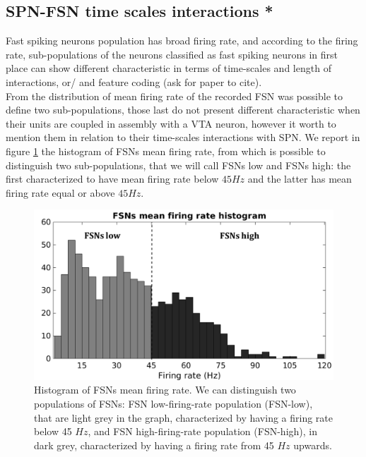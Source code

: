 \subsection{SPN-FSN time scales interactions *}
\label{sec:SPN-FSN_Bin}
Fast spiking neurons population has broad firing rate, and according to the firing rate, sub-populations of the neurons classified as fast spiking neurons in first place can show different characteristic in terms of time-scales and length of interactions, or/ and feature coding ({\color{red}ask for paper to cite}).\\From the distribution of mean firing rate of the recorded FSN was possible to define two sub-populations, those last do not present different characteristic when their units are coupled in assembly with a VTA neuron, however it worth to mention them in relation to their time-scales interactions with SPN. We report in figure \ref{fig:FSNsFireHisto} the histogram of FSNs mean firing rate, from which is possible to distinguish two sub-populations, that we will call FSNs low and FSNs high: the first characterized to have mean firing rate below $45 Hz$ and the latter has mean firing rate equal or above $45 Hz$.\\
\begin{figure}
    \centering
    \includegraphics[scale=0.6]{figures/FSNFiringRateLightDark.pdf}
    \caption{Histogram of FSNs mean firing rate. We can distinguish two populations of FSNs: FSN low-firing-rate population (FSN-low), that are light grey in the graph, characterized by having a firing rate below 45 $Hz$, and FSN high-firing-rate population (FSN-high), in dark grey, characterized by having a firing rate from 45 $Hz$ upwards.}
    \label{fig:FSNsFireHisto}
\end{figure}
